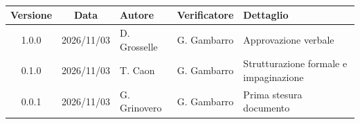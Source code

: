 \\[0.5cm]

\renewcommand{\arraystretch}{1.3}
\noindent\begin{tabularx}{\textwidth}{|c|c|>{\raggedright\arraybackslash}p{2.8cm}|>{\raggedright\arraybackslash}p{2.8cm}|X|}
    \hline
    \textbf{Versione} & \textbf{Data} & \textbf{Autore} & \textbf{Verificatore} & \textbf{Dettaglio} \\
    \hline
    1.0.0 & 2026/11/03 & D. Grosselle & G. Gambarro & Approvazione verbale \\
    \hline
    0.1.0 & 2026/11/03 & T. Caon & G. Gambarro & Strutturazione formale e impaginazione \\
    \hline
    0.0.1 & 2026/11/03 & G. Grinovero & G. Gambarro & Prima stesura documento \\
    \hline
\end{tabularx}
\newpage
